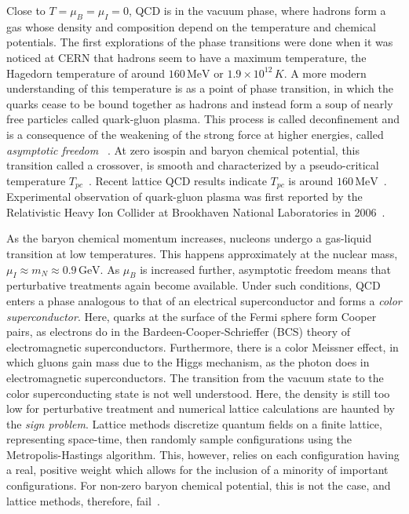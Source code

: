 Close to $T = \mu_B = \mu_I = 0$, QCD is in the vacuum phase, where hadrons form a gas whose density and composition depend on the temperature and chemical potentials.
The first explorations of the phase transitions were done when it was noticed at CERN that hadrons seem to have a maximum temperature, the Hagedorn temperature of around $160\,\text{MeV}$ or $1.9\times 10^{12} \, K$.
A more modern understanding of this temperature is as a point of phase transition, in which the quarks cease to be bound together as hadrons and instead form a soup of nearly free particles called quark-gluon plasma.
This process is called deconfinement and is a consequence of the weakening of the strong force at higher energies, called \emph{asymptotic freedom}
~\autocite{hagedornHadronicMatterBoiling1968,cabibboExponentialHadronicSpectrum1975}.
At zero isospin and baryon chemical potential, this transition called a crossover, is smooth and characterized by a pseudo-critical temperature $T_{pc}$~\autocite{fukushimaPhaseDiagramDense2010}.
Recent lattice QCD results indicate $T_{pc}$ is around $160\, \text{MeV}$~\autocite{borsanyiThereStillAny2010}.
Experimental observation of quark-gluon plasma was first reported by the Relativistic Heavy Ion Collider at Brookhaven National Laboratories in 2006~\autocite{adcoxFormationDensePartonic2005,backPHOBOSPerspectiveDiscoveries2005}.

As the baryon chemical momentum increases, nucleons undergo a gas-liquid transition at low temperatures.
This happens approximately at the nuclear mass, $\mu_I \approx m_N \approx 0.9 \, \text{GeV}$.
As $\mu_B$ is increased further, asymptotic freedom means that perturbative treatments again become available.
Under such conditions, QCD enters a phase analogous to that of an electrical superconductor and forms a \emph{color superconductor}.
Here, quarks at the surface of the Fermi sphere form Cooper pairs, as electrons do in the Bardeen-Cooper-Schrieffer (BCS) theory of electromagnetic superconductors.
Furthermore, there is a color Meissner effect, in which gluons gain mass due to the Higgs mechanism, as the photon does in electromagnetic superconductors.
The transition from the vacuum state to the color superconducting state is not well understood.
Here, the density is still too low for perturbative treatment and numerical lattice calculations are haunted by the \emph{sign problem}.
Lattice methods discretize quantum fields on a finite lattice, representing space-time, then randomly sample configurations using the Metropolis-Hastings algorithm.
This, however, relies on each configuration having a real, positive weight which allows for the inclusion of a minority of important configurations.
For non-zero baryon chemical potential, this is not the case, and lattice methods, therefore, fail~\autocite{troyerComputationalComplexityFundamental2005}.

